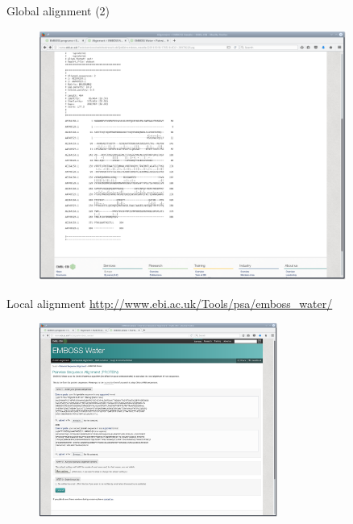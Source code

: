 \documentclass[pdf]{beamer}
\begin{document}
\begin{frame}{Global alignment (2)}
  \begin{figure}[ht]
    \includegraphics[width=0.9\textwidth]{images/emboss_needle_result}
  \end{figure}
\end{frame}

\begin{frame}{Local alignment}
  \url{http://www.ebi.ac.uk/Tools/psa/emboss_water/}
  \begin{figure}[ht]
    \includegraphics[width=0.7\textwidth]{images/emboss_water}
  \end{figure}
\end{frame}
\end{document}
